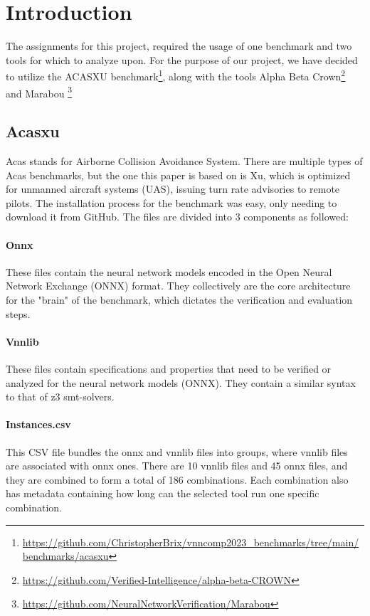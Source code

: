 
\chapter{Introduction}\label{cap:intro}

The assignments for this project, required the usage of one benchmark and two tools for which to analyze upon. For the purpose of our project, we have decided to utilize the ACASXU benchmark\footnote{\url{https://github.com/ChristopherBrix/vnncomp2023_benchmarks/tree/main/benchmarks/acasxu}}, along with the tools Alpha Beta Crown\footnote{\url{https://github.com/Verified-Intelligence/alpha-beta-CROWN}} and Marabou \footnote{\url{https://github.com/NeuralNetworkVerification/Marabou}}
\section{Acasxu}\label{sect:acasxu}
Acas stands for Airborne Collision Avoidance System. There are multiple types of Acas benchmarks, but the one this paper is based on is Xu, which is optimized for unmanned aircraft systems (UAS), issuing turn rate advisories to remote pilots\cite{katz2017reluplex}. The installation process for the benchmark was easy, only needing to download it from GitHub\footnotemark[1]. The files are divided into 3 components as followed:
\subsubsection{Onnx}
These files contain the neural network models encoded in the Open Neural Network Exchange (ONNX) format\cite{onnx}. They collectively are the core architecture for the "brain" of the benchmark, which dictates the verification and evaluation steps.
\subsubsection{Vnnlib}
These files contain specifications and properties that need to be verified or analyzed for the neural network models (ONNX). They contain a similar syntax to that of z3 smt-solvers.
\newpage
\subsubsection{Instances.csv}
This CSV file bundles the onnx and vnnlib files into groups, where vnnlib files are associated with onnx ones. There are 10 vnnlib files and 45 onnx files, and they are combined to form a total of 186 combinations. Each combination also has metadata containing how long can the selected tool run one specific combination. 

